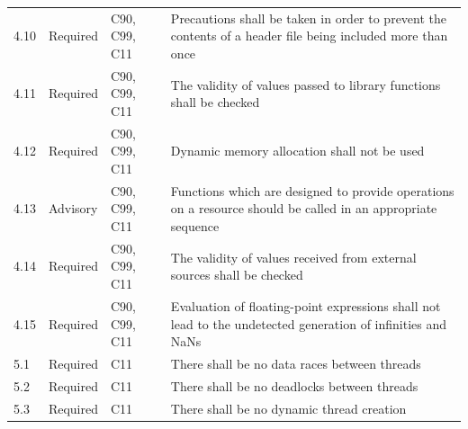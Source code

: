 \documentclass[11pt]{article}
\begin{document}
{\begin{longtable}{@{}p{1.2cm}p{1.8cm}p{2.2cm}p{10.2cm}@{}}
4.10 & Required & C90, C99, C11 & Precautions shall be taken in order to prevent the contents of a header file being included more than once \\
4.11 & Required & C90, C99, C11 & The validity of values passed to library functions shall be checked \\
4.12 & Required & C90, C99, C11 & Dynamic memory allocation shall not be used \\
4.13 & Advisory & C90, C99, C11 & Functions which are designed to provide operations on a resource should be called in an appropriate sequence \\
4.14 & Required & C90, C99, C11 & The validity of values received from external sources shall be checked \\
4.15 & Required & C90, C99, C11 & Evaluation of floating-point expressions shall not lead to the undetected generation of infinities and NaNs \\
5.1 & Required & C11 & There shall be no data races between threads \\
5.2 & Required & C11 & There shall be no deadlocks between threads \\
5.3 & Required & C11 & There shall be no dynamic thread creation \\
\end{longtable}
}
\end{document}
